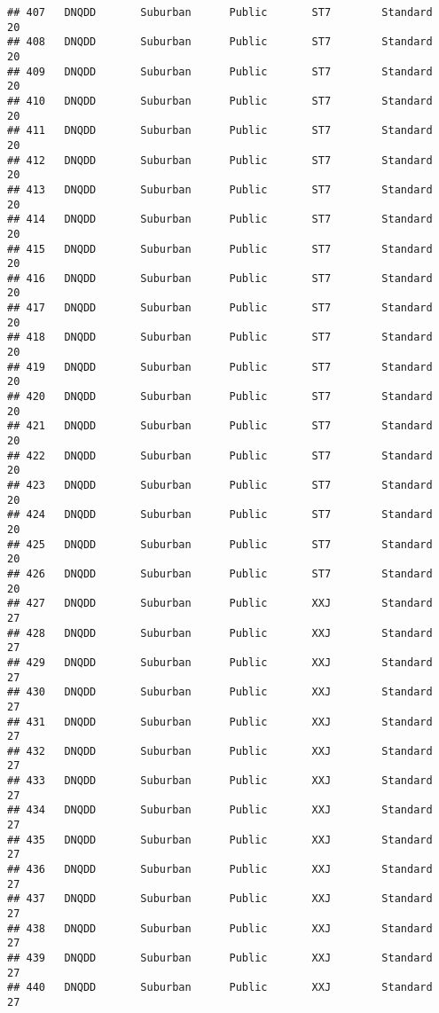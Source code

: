 \documentclass[
]{article}
\begin{document}
\begin{verbatim}
## 407   DNQDD       Suburban      Public       ST7        Standard        20
## 408   DNQDD       Suburban      Public       ST7        Standard        20
## 409   DNQDD       Suburban      Public       ST7        Standard        20
## 410   DNQDD       Suburban      Public       ST7        Standard        20
## 411   DNQDD       Suburban      Public       ST7        Standard        20
## 412   DNQDD       Suburban      Public       ST7        Standard        20
## 413   DNQDD       Suburban      Public       ST7        Standard        20
## 414   DNQDD       Suburban      Public       ST7        Standard        20
## 415   DNQDD       Suburban      Public       ST7        Standard        20
## 416   DNQDD       Suburban      Public       ST7        Standard        20
## 417   DNQDD       Suburban      Public       ST7        Standard        20
## 418   DNQDD       Suburban      Public       ST7        Standard        20
## 419   DNQDD       Suburban      Public       ST7        Standard        20
## 420   DNQDD       Suburban      Public       ST7        Standard        20
## 421   DNQDD       Suburban      Public       ST7        Standard        20
## 422   DNQDD       Suburban      Public       ST7        Standard        20
## 423   DNQDD       Suburban      Public       ST7        Standard        20
## 424   DNQDD       Suburban      Public       ST7        Standard        20
## 425   DNQDD       Suburban      Public       ST7        Standard        20
## 426   DNQDD       Suburban      Public       ST7        Standard        20
## 427   DNQDD       Suburban      Public       XXJ        Standard        27
## 428   DNQDD       Suburban      Public       XXJ        Standard        27
## 429   DNQDD       Suburban      Public       XXJ        Standard        27
## 430   DNQDD       Suburban      Public       XXJ        Standard        27
## 431   DNQDD       Suburban      Public       XXJ        Standard        27
## 432   DNQDD       Suburban      Public       XXJ        Standard        27
## 433   DNQDD       Suburban      Public       XXJ        Standard        27
## 434   DNQDD       Suburban      Public       XXJ        Standard        27
## 435   DNQDD       Suburban      Public       XXJ        Standard        27
## 436   DNQDD       Suburban      Public       XXJ        Standard        27
## 437   DNQDD       Suburban      Public       XXJ        Standard        27
## 438   DNQDD       Suburban      Public       XXJ        Standard        27
## 439   DNQDD       Suburban      Public       XXJ        Standard        27
## 440   DNQDD       Suburban      Public       XXJ        Standard        27

\end{verbatim}
\end{document}
